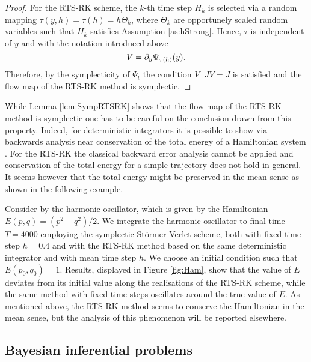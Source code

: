 \documentclass{siamart1116}
\numberwithin{theorem}{section}
\newcommand{\pdv}[2]{\ensuremath\partial_{#2}#1}
\begin{document}
{\begin{lemma}
\end{lemma}
\begin{proof} For the RTS-RK scheme, the $k$-th time step $H_k$ is selected via a random mapping $\tau(y, h) = \tau(h) = h\Theta_k$, where $\Theta_k$ are opportunely scaled random variables such that $H_k$ satisfies Assumption \ref{as:hStrong}. Hence, $\tau$ is independent of $y$ and with the notation introduced above 
\begin{equation}
	V = \pdv{\Psi_{\tau(h)}(y)}{y}.
\end{equation}
Therefore, by the symplecticity of $\Psi_t$ the condition $V^\top J V = J$ is satisfied and the flow map of the RTS-RK method is symplectic.
\end{proof}

While Lemma \ref{lem:SympRTSRK} shows that the flow map of the RTS-RK method is symplectic one has to be careful on the conclusion drawn from this property. Indeed, for deterministic integrators it is possible to show via backwards analysis near conservation of the total energy of a Hamiltonian system \cite{SaC94,HaL97,LeR01}. For the RTS-RK the classical backward error analysis cannot be applied and conservation of the total energy for a simple trajectory does not hold in general. It seems however that the total energy might be preserved in the mean sense as shown in the following example.

Consider by the harmonic oscillator, which is given by the Hamiltonian $E(p, q) = (p^2 + q^2) / 2$. We integrate the harmonic oscillator to final time $T = 4000$ employing the symplectic Störmer-Verlet scheme, both with fixed time step $h = 0.4$ and with the RTS-RK method based on the same deterministic integrator and with mean time step $h$. We choose an initial condition such that $E(p_0, q_0) = 1$. Results, displayed in Figure \ref{fig:Ham}, show that the value of $E$ deviates from its initial value along the realisations of the RTS-RK scheme, while the same method with fixed time steps oscillates around the true value of $E$. As mentioned above, the RTS-RK method seems to conserve the Hamiltonian in the mean sense, but the analysis of this phenomenon will be reported elsewhere.

\subsection{Bayesian inferential problems}\label{sec:BayesianInferenceEx}

}
\end{document}
